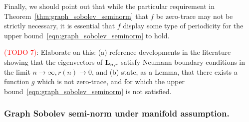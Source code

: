 \documentclass{article}
\newcommand{\1}{\mathbf{1}}
\newcommand{\Lap}{{\bf L}}
\theoremstyle{alden}
\theoremstyle{aldenthm}
\theoremstyle{definition}
\theoremstyle{remark}
\begin{document}
Finally, we should point out that while the particular requirement in Theorem~\ref{thm:graph_sobolev_seminorm} that $f$ be zero-trace may not be strictly necessary, it is essential that $f$ display some type of periodicity for the upper bound~\eqref{eqn:graph_sobolev_seminorm} to hold.

\textcolor{red}{(TODO 7)}: Elaborate on this: (a) reference developments in the literature showing that the eigenvectors of $\Lap_{n,r}$ satisfy Neumann boundary conditions in the limit $n \to \infty, r(n) \to 0$, and (b) state, as a Lemma, that there exists a function $g$ which is not zero-trace, and for which the upper bound~\eqref{eqn:graph_sobolev_seminorm} is not satisfied.

\subsubsection{Graph Sobolev semi-norm under manifold assumption.}
\end{document}
